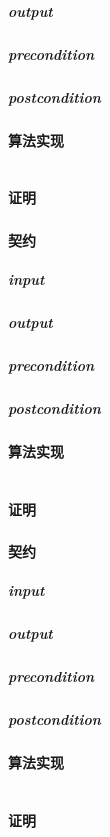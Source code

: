 \documentclass[a4paper]{book}
\numberwithin{equation}{chapter}
\theoremstyle{definition}
\begin{document}
\begin{multicols}{2}
\subparagraph{output}

\subparagraph{precondition}

\subparagraph{postcondition}

\paragraph{算法实现}
\begin{lstlisting}

\end{lstlisting}
\paragraph{证明}

\subsubsection{}
\paragraph{契约}
\subparagraph{input}

\subparagraph{output}

\subparagraph{precondition}

\subparagraph{postcondition}

\paragraph{算法实现}
\begin{lstlisting}

\end{lstlisting}
\paragraph{证明}

\subsubsection{}
\paragraph{契约}
\subparagraph{input}

\subparagraph{output}

\subparagraph{precondition}

\subparagraph{postcondition}

\paragraph{算法实现}
\begin{lstlisting}

\end{lstlisting}
\paragraph{证明}



\end{multicols}
\end{document}
